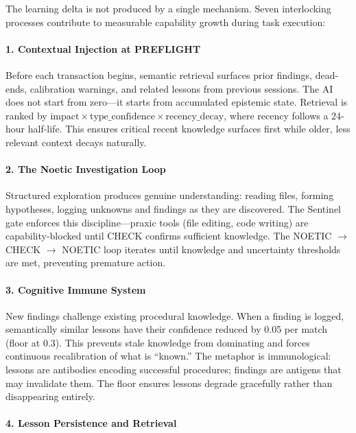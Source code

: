 The learning delta is not produced by a single mechanism. Seven interlocking processes contribute to measurable capability growth during task execution:

\paragraph{1. Contextual Injection at PREFLIGHT}

Before each transaction begins, semantic retrieval surfaces prior findings, dead-ends, calibration warnings, and related lessons from previous sessions. The AI does not start from zero---it starts from accumulated epistemic state. Retrieval is ranked by $\text{impact} \times \text{type\_confidence} \times \text{recency\_decay}$, where recency follows a 24-hour half-life. This ensures critical recent knowledge surfaces first while older, less relevant context decays naturally.

\paragraph{2. The Noetic Investigation Loop}

Structured exploration produces genuine understanding: reading files, forming hypotheses, logging unknowns and findings as they are discovered. The Sentinel gate enforces this discipline---praxic tools (file editing, code writing) are capability-blocked until CHECK confirms sufficient knowledge. The NOETIC $\rightarrow$ CHECK $\rightarrow$ NOETIC loop iterates until knowledge and uncertainty thresholds are met, preventing premature action.

\paragraph{3. Cognitive Immune System}

New findings challenge existing procedural knowledge. When a finding is logged, semantically similar lessons have their confidence reduced by 0.05 per match (floor at 0.3). This prevents stale knowledge from dominating and forces continuous recalibration of what is ``known.'' The metaphor is immunological: lessons are antibodies encoding successful procedures; findings are antigens that may invalidate them. The floor ensures lessons degrade gracefully rather than disappearing entirely.

\paragraph{4. Lesson Persistence and Retrieval}

